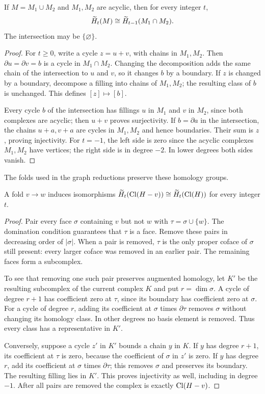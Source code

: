 \begin{lemma}\label{hom:lem:union}
If \(M=M_1\cup M_2\) and \(M_1,M_2\) are acyclic, then for every integer \(t\),
\[
 \widetilde H_t(M)\cong\widetilde H_{t-1}(M_1\cap M_2).
\]
The intersection may be \(\{\varnothing\}\).
\end{lemma}
\begin{proof}
For \(t\geq0\), write a cycle \(z=u+v\), with chains in \(M_1,M_2\).
Then \(\partial u=\partial v=b\) is a cycle in \(M_1\cap M_2\).
Changing the decomposition adds the same chain of the intersection
to \(u\) and \(v\), so it changes \(b\) by a boundary. If \(z\) is
changed by a boundary, decompose a filling into chains of \(M_1,M_2\);
the resulting class of \(b\) is unchanged. This defines
\([z]\mapsto[b]\).

Every cycle \(b\) of the intersection has fillings \(u\) in \(M_1\)
and \(v\) in \(M_2\), since both complexes are acyclic; then \(u+v\)
proves surjectivity. If \(b=\partial a\) in the intersection, the
chains \(u+a,v+a\) are cycles in \(M_1,M_2\) and hence boundaries.
Their sum is \(z\), proving injectivity.
For \(t=-1\), the left side is zero since the acyclic complexes
\(M_1,M_2\) have vertices; the right side is in degree \(-2\).
In lower degrees both sides vanish.
\end{proof}

The folds used in the graph reductions preserve these homology groups.

\begin{lemma}\label{hom:lem:fold}
A fold \(v\to w\) induces isomorphisms
\(\widetilde H_t(\operatorname{Cl}(H-v))\cong\widetilde H_t(\operatorname{Cl}(H))\) for every integer \(t\).
\end{lemma}
\begin{proof}
Pair every face \(\sigma\) containing \(v\) but not \(w\) with
\(\tau=\sigma\cup\{w\}\). The domination condition guarantees that
\(\tau\) is a face. Remove these pairs in decreasing order of
\(|\sigma|\). When a pair is removed, \(\tau\) is the only proper
coface of \(\sigma\) still present: every larger coface was removed
in an earlier pair. The remaining faces form a subcomplex.

To see that removing one such pair preserves augmented homology,
let \(K'\) be the resulting subcomplex of the current complex \(K\)
and put \(r=\dim\sigma\). A cycle of degree \(r+1\) has coefficient
zero at \(\tau\), since its boundary has coefficient zero at
\(\sigma\). For a cycle of degree \(r\), adding its coefficient at
\(\sigma\) times \(\partial\tau\) removes \(\sigma\) without changing
its homology class. In other degrees no basis element is removed.
Thus every class has a representative in \(K'\).

Conversely, suppose a cycle \(z'\) in \(K'\) bounds a chain \(y\)
in \(K\). If \(y\) has degree \(r+1\), its coefficient at \(\tau\)
is zero, because the coefficient of \(\sigma\) in \(z'\) is zero.
If \(y\) has degree \(r\), add its coefficient at \(\sigma\) times
\(\partial\tau\); this removes \(\sigma\) and preserves its
boundary. The resulting filling lies in \(K'\). This proves
injectivity as well, including in degree \(-1\).
After all pairs are removed the complex is exactly \(\operatorname{Cl}(H-v)\).
\end{proof}


